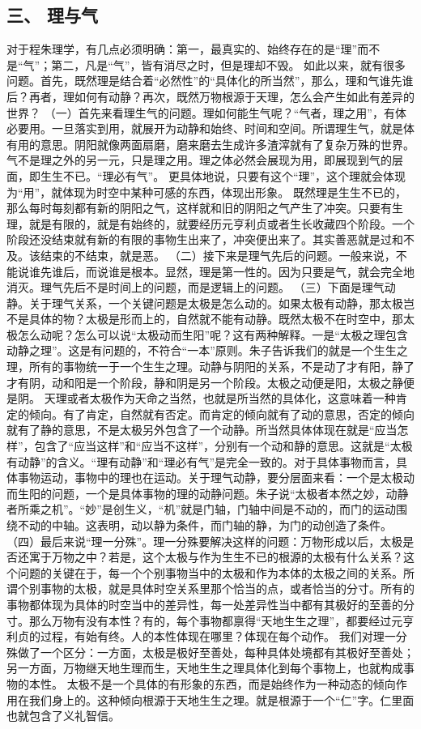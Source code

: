 \documentclass{article}
\begin{document}
\subsection{三、	理与气}
对于程朱理学，有几点必须明确：第一，最真实的、始终存在的是“理”而不是“气”；第二，凡是“气”，皆有消尽之时，但是理却不毁。
如此以来，就有很多问题。首先，既然理是结合着“必然性”的“具体化的所当然”，那么，理和气谁先谁后？再者，理如何有动静？再次，既然万物根源于天理，怎么会产生如此有差异的世界？
（一）首先来看理生气的问题。理如何能生气呢？“气者，理之用”，有体必要用。一旦落实到用，就展开为动静和始终、时间和空间。所谓理生气，就是体有用的意思。阴阳就像两面扇磨，磨来磨去生成许多渣滓就有了复杂万殊的世界。
气不是理之外的另一元，只是理之用。理之体必然会展现为用，即展现到气的层面，即生生不已。“理必有气”。
更具体地说，只要有这个“理”，这个理就会体现为“用”，就体现为时空中某种可感的东西，体现出形象。
既然理是生生不已的，那么每时每刻都有新的阴阳之气，这样就和旧的阴阳之气产生了冲突。只要有生理，就是有限的，就是有始终的，就要经历元亨利贞或者生长收藏四个阶段。一个阶段还没结束就有新的有限的事物生出来了，冲突便出来了。其实善恶就是过和不及。该结束的不结束，就是恶。
（二）接下来是理气先后的问题。一般来说，不能说谁先谁后，而说谁是根本。显然，理是第一性的。因为只要是气，就会完全地消灭。理气先后不是时间上的问题，而是逻辑上的问题。
（三）下面是理气动静。关于理气关系，一个关键问题是太极是怎么动的。如果太极有动静，那太极岂不是具体的物？太极是形而上的，自然就不能有动静。既然太极不在时空中，那太极怎么动呢？怎么可以说“太极动而生阳”呢？这有两种解释。一是“太极之理包含动静之理”。这是有问题的，不符合“一本”原则。朱子告诉我们的就是一个生生之理，所有的事物统一于一个生生之理。动静与阴阳的关系，不是动了才有阳，静了才有阴，动和阳是一个阶段，静和阴是另一个阶段。太极之动便是阳，太极之静便是阴。
天理或者太极作为天命之当然，也就是所当然的具体化，这意味着一种肯定的倾向。有了肯定，自然就有否定。而肯定的倾向就有了动的意思，否定的倾向就有了静的意思，不是太极另外包含了一个动静。所当然具体体现在就是“应当怎样”，包含了“应当这样”和“应当不这样”，分别有一个动和静的意思。这就是“太极有动静”的含义。“理有动静”和“理必有气”是完全一致的。对于具体事物而言，具体事物运动，事物中的理也在运动。关于理气动静，要分层面来看：一个是太极动而生阳的问题，一个是具体事物的理的动静问题。朱子说“太极者本然之妙，动静者所乘之机”。“妙”是创生义，“机”就是门轴，门轴中间是不动的，而门的运动围绕不动的中轴。这表明，动以静为条件，而门轴的静，为门的动创造了条件。
（四）最后来说“理一分殊”。理一分殊要解决这样的问题：万物形成以后，太极是否还寓于万物之中？若是，这个太极与作为生生不已的根源的太极有什么关系？这个问题的关键在于，每一个个别事物当中的太极和作为本体的太极之间的关系。所谓个别事物的太极，就是具体时空关系里那个恰当的点，或者恰当的分寸。所有的事物都体现为具体的时空当中的差异性，每一处差异性当中都有其极好的至善的分寸。那么万物有没有本性？有的，每个事物都禀得“天地生生之理”，都要经过元亨利贞的过程，有始有终。人的本性体现在哪里？体现在每个动作。
我们对理一分殊做了一个区分：一方面，太极是极好至善处，每种具体处境都有其极好至善处；另一方面，万物继天地生理而生，天地生生之理具体化到每个事物上，也就构成事物的本性。
太极不是一个具体的有形象的东西，而是始终作为一种动态的倾向作用在我们身上的。这种倾向根源于天地生生之理。就是根源于一个“仁”字。仁里面也就包含了义礼智信。
\end{document}
